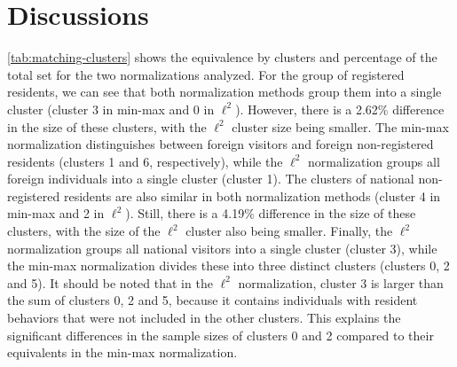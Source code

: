 \chapter{Discussions}
\label{ch:discussions}

\cref{tab:matching-clusters} shows the equivalence by clusters and percentage of the total set for the two normalizations analyzed. For the group of registered residents, we can see that both normalization methods group them into a single cluster (cluster 3 in min-max and 0 in $\ell^2$). However, there is a 2.62\% difference in the size of these clusters, with the $\ell^2$ cluster size being smaller. The min-max normalization distinguishes between foreign visitors and foreign non-registered residents (clusters 1 and 6, respectively), while the $\ell^2$ normalization groups all foreign individuals into a single cluster (cluster 1). The clusters of national non-registered residents are also similar in both normalization methods (cluster 4 in min-max and 2 in $\ell^2$). Still, there is a 4.19\% difference in the size of these clusters, with the size of the $\ell^2$ cluster also being smaller. Finally, the $\ell^2$ normalization groups all national visitors into a single cluster (cluster 3), while the min-max normalization divides these into three distinct clusters (clusters 0, 2 and 5). It should be noted that in the $\ell^2$ normalization, cluster 3 is larger than the sum of clusters 0, 2 and 5, because it contains individuals with resident behaviors that were not included in the other clusters. This explains the significant differences in the sample sizes of clusters 0 and 2 compared to their equivalents in the min-max normalization.

\begin{table}[]
\centering
{}
\caption{Equivalence of the clusters made for each normalization.}
\label{tab:matching-clusters}
\end{table}

